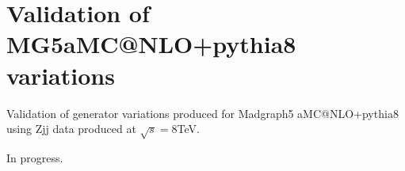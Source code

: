 \section{Validation of MG5aMC@NLO+pythia8 variations}
\label{sec:madgraph}

Validation of generator variations produced for Madgraph5 aMC@NLO+pythia8 using Zjj data produced at $\sqrt{s}=8$TeV.

In progress. 